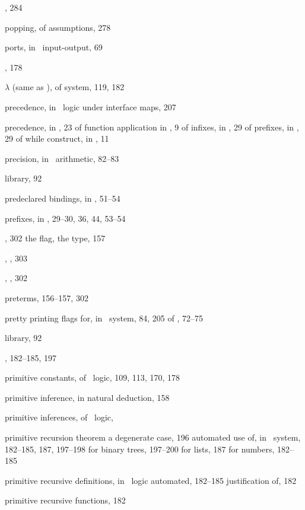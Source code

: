 \begin{theindex}
  \item {}, 284
  \item popping, of assumptions, 278
  \item ports, in \ML\ input-output, 69
  \item {}, 178
  \item {}$\lambda$ (same as ), of  system, 
		119, 182
  \item precedence, in \HOL\ logic
    \subitem under interface maps, 207
  \item precedence, in \ML, 23
    \subitem of function application in \ML, 9
    \subitem of infixes, in \ML, 29
    \subitem of prefixes, in \ML, 29
    \subitem of while construct, in \ML, 11
  \item precision, in \ML\ arithmetic, 82--83
  \item {} library, 92
  \item predeclared bindings, in \ML, 51--54
  \item prefixes, in \ML, 29--30, 36, 44, 53--54
  \item {}, 302
    \subitem the flag, 
    \subitem the type, 157
  \item {}, , 303
  \item {}, , 302
  \item preterms, 156--157, 302
  \item pretty printing
    \subitem flags for, in \HOL\ system, 84, 205
    \subitem of \ML, 72--75
  \item {} library, 92
  \item {}, 182--185, 197
  \item primitive constants, of \HOL\ logic, 109, 113, 170, 178
  \item primitive inference, in natural deduction, 158
  \item primitive inferences, of \HOL\ logic, 
  \item primitive recursion theorem
    \subitem a degenerate case, 196
    \subitem automated use of, in \HOL\ system, 182--185, 187, 197--198
    \subitem for binary trees, 197--200
    \subitem for lists, 187
    \subitem for numbers, 182--185
  \item primitive recursive definitions, in \HOL\ logic
    \subitem automated, 182--185
    \subitem justification of, 182
  \item primitive recursive functions, 182

\end{theindex}

